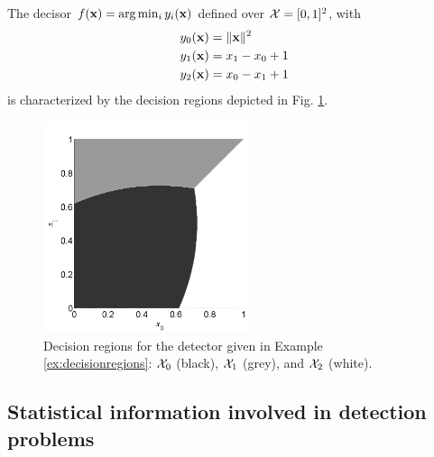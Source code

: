 \begin{example}
\label{ex:decisionregions}
The decisor $f({\bf x}) = \arg\min_i y_i({\bf x})$ defined over ${\cal X} = [0,1]^2$, with
\begin{align}
y_0({\bf x}) & = \|{\bf x}\|^2 \nonumber \\
y_1({\bf x}) & = x_1 - x_0 +1 \nonumber \\
y_2({\bf x}) & = x_0 - x_1 + 1 \nonumber 
\end{align}
is characterized by the decision regions depicted in Fig. \ref{fig:decisionregions}.

    \begin{figure}
        \begin{center}
            \includegraphics[width=6cm]{Figures//DecRegEx.pdf}
        \end{center}
        \caption{Decision regions for the detector given in Example \ref{ex:decisionregions}: ${\cal X}_0$ (black), ${\cal X}_1$ (grey), and ${\cal X}_2$ (white).\label{fig:decisionregions}}
    \end{figure}
    
\end{example}

\subsection{Statistical information involved in detection problems}
\label{subsec:statistical_info}

